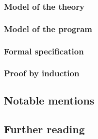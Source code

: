 \subsubsection{Model of the theory}

\subsubsection{Model of the program}

\subsubsection{Formal specification}

\subsubsection{Proof by induction}

\subsection{Notable mentions}\label{S:ex_notable}

\subsection{Further reading}\label{S:ex_reading}
